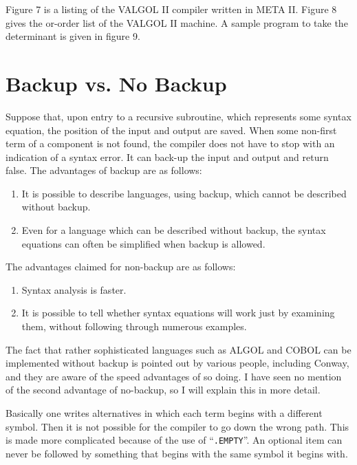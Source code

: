 \documentclass[notitlepage,twocolumn]{report}
\begin{document}

Figure 7 is a listing of the VALGOL II compiler written in META
II. Figure 8 gives the or-order list of the VALGOL II machine. A
sample program to take the determinant is given in figure 9.


\section*{Backup vs. No Backup}

Suppose that, upon entry to a recursive subroutine, which represents
some syntax equation, the position of the input and output are
saved. When some non-first term of a component is not found, the
compiler does not have to stop with an indication of a syntax
error. It can back-up the input and output and return false. The
advantages of backup are as follows:

\begin{enumerate}
\item It is possible to describe languages, using backup, which cannot
  be described without backup.
\item Even for a language which can be described without backup, the
  syntax equations can often be simplified when backup is allowed.
\end{enumerate}

The advantages claimed for non-backup are as follows:

\begin{enumerate}
\item Syntax analysis is faster.
\item It is possible to tell whether syntax equations will work just
  by examining them, without following through numerous examples.
\end{enumerate}

The fact that rather sophisticated languages such as ALGOL and COBOL
can be implemented without backup is pointed out by various people,
including Conway, and they are aware of the speed
advantages of so doing. I have seen no mention of the second advantage
of no-backup, so I will explain this in more detail.

Basically one writes alternatives in which each term begins with a
different symbol. Then it is not possible for the compiler to go down
the wrong path. This is made more complicated because of the use of
``\texttt{.EMPTY}''. An optional item can never be followed by
something that begins with the same symbol it begins with.
\end{document}
